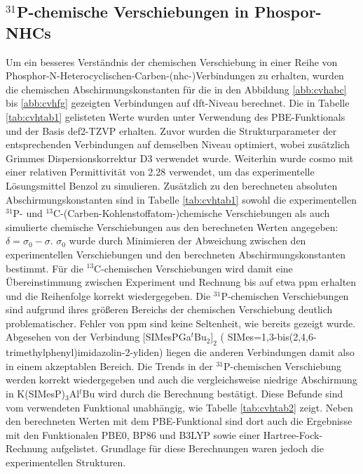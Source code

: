 \subsection{\texorpdfstring{$^{31}$P}{31P}-chemische Verschiebungen in Phospor-NHCs}
Um ein besseres Verständnis der chemischen Verschiebung in einer Reihe von Phosphor-N-Heterocyclischen-Carben-(\acs{nhc}-)Verbindungen \supercite{lemp2017nhc} zu erhalten, wurden die chemischen Abschirmungskonstanten für die in den Abbildung \ref{abb:cvhabc} bis \ref{abb:cvhfg} gezeigten Verbindungen auf \ac{dft}-Niveau berechnet. Die in Tabelle \ref{tab:cvhtab1} gelisteten Werte wurden unter Verwendung des PBE-Funktionals\supercite{perdew1996generalized} und der Basis def2-TZVP\supercite{weigend2005balanced} erhalten. Zuvor wurden die Strukturparameter der entsprechenden Verbindungen auf demselben Niveau optimiert, wobei zusätzlich Grimmes Dispersionskorrektur D3\supercite{grimme2010consistent,grimme2011effect} verwendet wurde. Weiterhin wurde \ac{cosmo}\supercite{klamt1993cosmo} mit einer relativen Permittivität von 2.28\supercite{maryott1951table} verwendet, um das experimentelle Lösungsmittel Benzol zu simulieren. Zusätzlich zu den berechneten absoluten Abschirmungskonstanten sind in Tabelle \ref{tab:cvhtab1} sowohl die experimentellen $^{31}$P- und $^{13}$C-(Carben-Kohlenstoffatom-)chemische Verschiebungen als auch simulierte chemische Verschiebungen aus den berechneten Werten angegeben: $\delta=\sigma_0-\sigma$. $\sigma_0$ wurde durch Minimieren der Abweichung zwischen den experimentellen Verschiebungen und den berechneten Abschirmungskonstanten bestimmt. Für die $^{13}$C-chemischen Verschiebungen wird damit eine Übereinstimmung zwischen Experiment und Rechnung bis auf etwa \unit[2]{ppm} erhalten und die Reihenfolge korrekt wiedergegeben. Die $^{31}$P-chemischen Verschiebungen sind aufgrund ihres größeren Bereichs der chemischen Verschiebung deutlich problematischer. Fehler von \unit[30]{ppm} sind keine Seltenheit, wie bereits gezeigt wurde.\supercite{latypov2015quantum,reiter2017calculation} Abgesehen von der Verbindung $[$SIMesPGa$^\textit{t}$Bu$_2]_2$ ( SIMes=1,3-bis(2,4,6-tri\-me\-thyl\-phe\-nyl)imi\-da\-zo\-lin-2-yli\-den) liegen die anderen Verbindungen damit also in einem akzeptablen Bereich. Die Trends in der $^{31}$P-chemischen Verschiebung werden korrekt wiedergegeben und auch die vergleichsweise niedrige Abschirmung in K(SIMesP)$_3$Al$^\textit{t}$Bu wird durch die Berechnung bestätigt. Diese Befunde sind vom verwendeten Funktional unabhängig, wie Tabelle \ref{tab:cvhtab2} zeigt. Neben den berechneten Werten mit dem PBE-Funktional sind dort auch die Ergebnisse mit den Funktionalen PBE0,\supercite{adamo1999toward} BP86\supercite{perdew1986density,becke1988density} und B3LYP\supercite{becke1993density,lee1988development,stephens1994ab} sowie einer Hartree-Fock-Rechnung aufgelistet. Grundlage für diese Berechnungen waren jedoch die experimentellen Strukturen.


